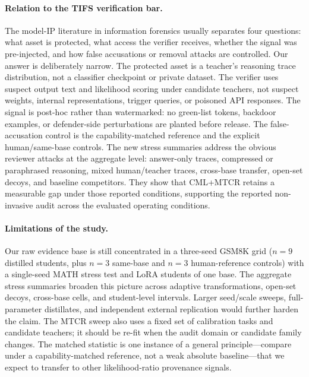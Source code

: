 \documentclass[journal]{IEEEtran}
\begin{document}
\paragraph{Relation to the TIFS verification bar.}
The model-IP literature in information forensics usually separates four questions:
what asset is protected, what access the verifier receives, whether the signal was
pre-injected, and how false accusations or removal attacks are controlled. Our
answer is deliberately narrow. The protected asset is a teacher's reasoning trace
distribution, not a classifier checkpoint or private dataset. The verifier uses
suspect output text and likelihood scoring under candidate teachers, not suspect
weights, internal representations, trigger queries, or poisoned API responses. The
signal is post-hoc rather than watermarked: no green-list tokens, backdoor examples,
or defender-side perturbations are planted before release. The false-accusation
control is the capability-matched reference and the explicit human/same-base
controls. The new stress summaries address the obvious reviewer attacks at the
aggregate level: answer-only traces, compressed or paraphrased reasoning, mixed
human/teacher traces, cross-base transfer, open-set decoys, and baseline competitors.
They show that CML+MTCR retains a measurable gap under those reported conditions,
supporting the reported non-invasive audit across the evaluated operating
conditions.

\paragraph{Limitations of the study.}
Our raw evidence base is still concentrated in a three-seed GSM8K grid ($n\!=\!9$
distilled students, plus $n\!=\!3$ same-base and $n\!=\!3$ human-reference controls)
with a single-seed MATH stress test and LoRA students of one base. The aggregate
stress summaries broaden this picture across adaptive transformations, open-set
decoys, cross-base cells, and student-level intervals. Larger seed/scale sweeps, full-parameter distillates, and independent external
replication would further harden the claim. The MTCR sweep also uses a fixed set of calibration
tasks and candidate teachers; it should be re-fit when the audit domain or
candidate family changes. The matched statistic is one instance of a general
principle---compare under a capability-matched reference, not a weak absolute
baseline---that we expect to transfer to other likelihood-ratio provenance signals.
\end{document}

